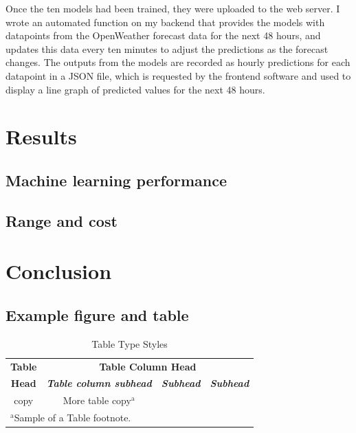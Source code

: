 \documentclass[conference]{IEEEtran}
\begin{document}
Once the ten models had been trained, they were uploaded to the web server. I
wrote an automated function on my backend that provides the models with
datapoints from the OpenWeather forecast data for the next 48 hours, and updates
this data every ten minutes to adjust the predictions as the forecast changes.
The outputs from the models are recorded as hourly predictions for each
datapoint in a JSON file, which is requested by the frontend software and used
to display a line graph of predicted values for the next 48 hours.

\section{Results}\label{RES}

\subsection{Machine learning performance}

\subsection{Range and cost}

\section{Conclusion}\label{CONC}

\subsection{Example figure and table}\label{FAT}

\begin{table}[htbp]
\caption{Table Type Styles}
\begin{center}
\begin{tabular}{|c|c|c|c|}
\hline
\textbf{Table}&\multicolumn{3}{|c|}{\textbf{Table Column Head}} \\
\cline{2-4} 
\textbf{Head} & \textbf{\textit{Table column subhead}}&
\textbf{\textit{Subhead}}& \textbf{\textit{Subhead}} \\
\hline
copy& More table copy$^{\mathrm{a}}$& &  \\
\hline
\multicolumn{4}{l}{$^{\mathrm{a}}$Sample of a Table footnote.}
\end{tabular}
\label{tab1}
\end{center}
\end{table}



\end{document}
